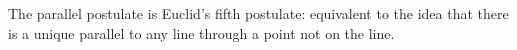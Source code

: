 \documentclass[12pt]{article}
\begin{document}
The parallel postulate is Euclid's fifth postulate: equivalent to the idea that there is a unique parallel to any line through a point not on the line.
\end{document}
